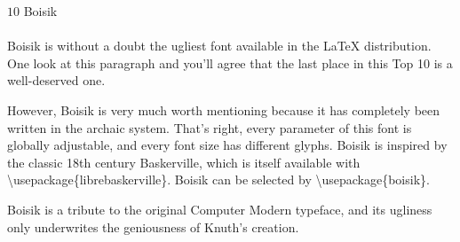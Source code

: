 \documentclass{article}
\begin{document}
\frenchspacing
\noindent
{\LARGE $10$ Boisik}~\\
~\\
Boisik is without a doubt the ugliest font available in the \LaTeX{}
distribution.  One look at this paragraph and you'll agree that the
last place in this Top 10 is a well-deserved one.

However, Boisik is very much worth mentioning because it has
completely been written in the archaic \MF{} system.  That's right,
every parameter of this font is globally adjustable, and every font
size has different glyphs.  Boisik is inspired by the classic 18th
century {\librebaskerville\small Baskerville}, which is itself
available with \textbackslash{}usepackage\{librebaskerville\}. Boisik
can be selected by \textbackslash{}usepackage\{boisik\}.

Boisik
is a tribute to the original Computer Modern typeface, and its
ugliness only underwrites the geniousness of Knuth's creation.
\end{document}
